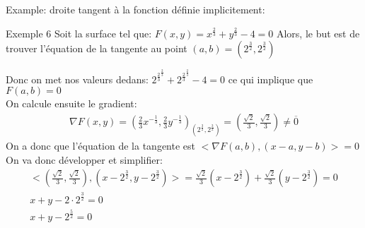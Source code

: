 \begin{parag}{Example: droite tangent à la fonction définie implicitement:}
    \begin{subparag}{Exemple 6}
        Soit la surface tel que: $F\left(x, y\right) = x^{\frac{2}{3}} + y^{\frac{2}{3}} - 4 = 0$ Alors, le but est de trouver l'équation de la tangente au point $\left(a, b\right) = \left(2^{\frac{3}{2}}, 2^{\frac{3}{2}}\right)$

        Donc on met nos valeurs dedans: $2^{\frac{2}{3}}^{\frac{2}{3}} + 2^{\frac{2}{3}}^{\frac{2}{3}} - 4 = 0 $ ce qui implique que $F\left(a, b\right) = 0$\\
On calcule ensuite le gradient:
\begin{align*} \nabla F\left(x, y\right) = \left(\frac{2}{3}x^{-\frac{1}{3}}, \frac{2}{3}y^{-\frac{1}{3}}\right)_{\left(2^{\frac{3}{2}}, 2^{\frac{3}{2}}\right)} = \left(\frac{\sqrt{2}}{3}, \frac{\sqrt{2}}{3}\right) \neq \overline{0} \end{align*}
On a donc que l'équation de la tangente est $< \nabla F\left(a, b\right), \left(x-a, y-b\right)> = 0$\\
On va donc développer et simplifier:
\begin{align*} 
    <\left(\frac{\sqrt{2}}{3},\frac{\sqrt{2}}{3}\right) , \left(x - 2^{\frac{3}{2}}, y - 2^{\frac{3}{2}}\right)> = \frac{\sqrt{2}}{3} \left(x-2^{\frac{3}{2}}\right) + \frac{\sqrt{2}}{3}\left(y - 2^{\frac{3}{2}}\right) =  0\\
        x + y - 2\cdot 2^{\frac{3}{2}} = 0\\
        x + y - 2 ^{\frac{5}{2}} =  0
\end{align*}
    \end{subparag}
    
\end{parag}


